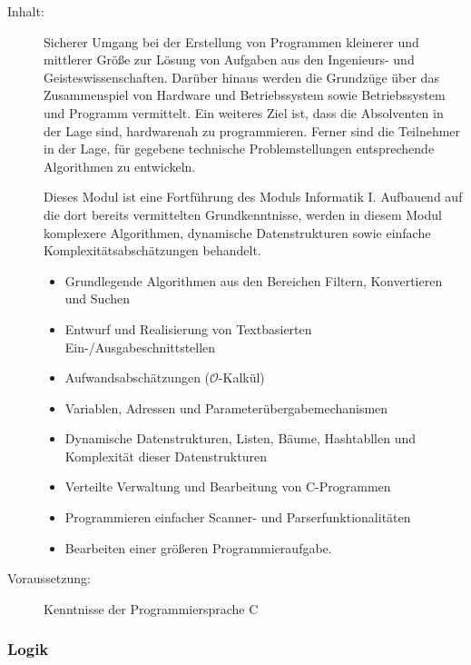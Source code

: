 \documentclass[%
a4paper, %
11pt,               %
leqno,              %
fleqn,              %
]
{scrartcl}
\begin{document}
\begin{description}
  \item[Inhalt:] Sicherer Umgang bei der Erstellung von Programmen kleinerer und
    mittlerer Größe zur Lösung von Aufgaben aus den Ingenieurs- und
    Geisteswissenschaften. Darüber hinaus werden die Grundzüge über das
    Zusammenspiel von Hardware und Betriebssystem sowie Betriebssystem und
    Programm vermittelt. Ein weiteres Ziel ist, dass die Absolventen in der Lage
    sind, hardwarenah zu programmieren. Ferner sind die Teilnehmer in der Lage,
    für gegebene technische Problemstellungen entsprechende Algorithmen zu
    entwickeln.

    Dieses Modul ist eine Fortführung des Moduls Informatik I. Aufbauend auf
    die dort bereits vermittelten Grundkenntnisse, werden in diesem Modul
    komplexere Algorithmen, dynamische Datenstrukturen sowie einfache
    Komplexitätsabschätzungen behandelt.

    \begin{itemize}\itemsep0pt
      \item Grundlegende Algorithmen aus den Bereichen Filtern, Konvertieren und
        Suchen
      \item Entwurf und Realisierung von Textbasierten
        Ein-/Ausgabeschnittstellen
      \item Aufwandsabschätzungen ($\mathcal{O}$-Kalkül)
      \item Variablen, Adressen und Parameterübergabemechanismen
      \item Dynamische Datenstrukturen, Listen, Bäume, Hashtabllen und
        Komplexität dieser Datenstrukturen
      \item Verteilte Verwaltung und Bearbeitung von C-Programmen
      \item Programmieren einfacher Scanner- und Parserfunktionalitäten
      \item Bearbeiten einer größeren Programmieraufgabe.
    \end{itemize}
  \item[Voraussetzung:] Kenntnisse der Programmiersprache C
\end{description}


\subsubsection{Logik} %
\label{ssub:Logik}
\end{document}
